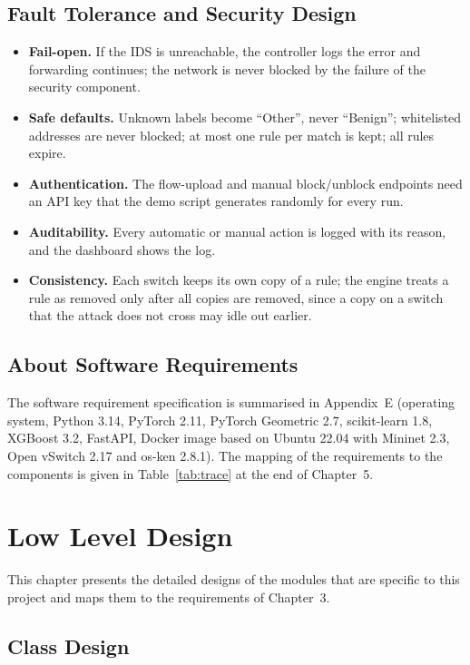 \section{Fault Tolerance and Security Design}
\begin{itemize}
	\item \textbf{Fail-open.} If the IDS is unreachable, the controller logs the error and forwarding continues; the network is never blocked by the failure of the security component.
	\item \textbf{Safe defaults.} Unknown labels become ``Other'', never ``Benign''; whitelisted addresses are never blocked; at most one rule per match is kept; all rules expire.
	\item \textbf{Authentication.} The flow-upload and manual block/unblock endpoints need an API key that the demo script generates randomly for every run.
	\item \textbf{Auditability.} Every automatic or manual action is logged with its reason, and the dashboard shows the log.
	\item \textbf{Consistency.} Each switch keeps its own copy of a rule; the engine treats a rule as removed only after all copies are removed, since a copy on a switch that the attack does not cross may idle out earlier.
\end{itemize}

\section{About Software Requirements}
The software requirement specification is summarised in Appendix~E (operating system, Python 3.14, PyTorch 2.11, PyTorch Geometric 2.7, scikit-learn 1.8, XGBoost 3.2, FastAPI, Docker image based on Ubuntu 22.04 with Mininet 2.3, Open vSwitch 2.17 and os-ken 2.8.1). The mapping of the requirements to the components is given in Table~\ref{tab:trace} at the end of Chapter~5.



\chapter{Low Level Design}
This chapter presents the detailed designs of the modules that are specific to this project and maps them to the requirements of Chapter~3.\\

\section{Class Design}

